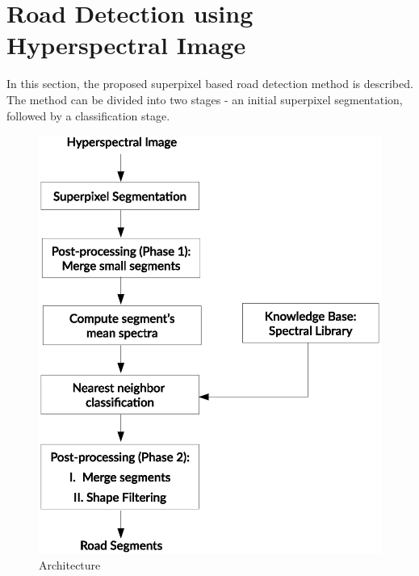 \documentclass[12pt,twoside]{article}
\theoremstyle{plain}
\theoremstyle{definition}
\theoremstyle{remark}
\begin{document}
\section{Road Detection using Hyperspectral Image}
\label{sec:model}
In this section, the proposed superpixel based road detection method is described. The method can be divided into two stages - an initial superpixel segmentation, followed by a classification stage. 
\begin{figure}[hbtp]
\centering
\includegraphics[width=\textwidth]{src/model.eps}
\caption{Architecture}
\label{fig:arch}
\end{figure}
\end{document}
